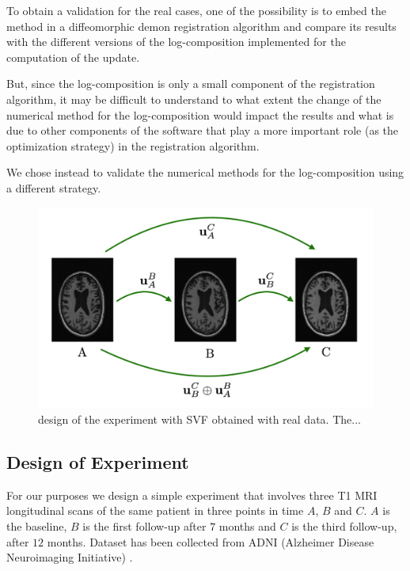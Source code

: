 To obtain a validation for the real cases, one of the possibility is to embed the method in a diffeomorphic demon registration algorithm and compare its results with the different versions of the log-composition implemented for the computation of the update.

But, since the log-composition is only a small component of the registration algorithm, it may be difficult to understand to what extent the change of the numerical method for the log-composition would impact the results and what is due to other components of the software that play a more important role (as the optimization strategy) in the registration algorithm.

We chose instead to validate the numerical methods for the log-composition using a different strategy.

\begin{figure}[!ht]
	\centering
	\includegraphics[scale=0.25]{figures/three_brains_problem.pdf}
	\caption{design of the experiment with SVF obtained with real data. The... }
	\label{fig:three_brains_problem}
\end{figure}

\subsection{Design of Experiment}
For our purposes we design a simple experiment that involves three T1 MRI longitudinal scans of the same patient in three points in time $A$, $B$ and $C$. $A$ is the baseline, $B$ is the first follow-up after $7$ months and $C$ is the third follow-up, after $12$ months. Dataset has been collected from ADNI (Alzheimer Disease Neuroimaging Initiative) \cite{jack2008alzheimer}.


